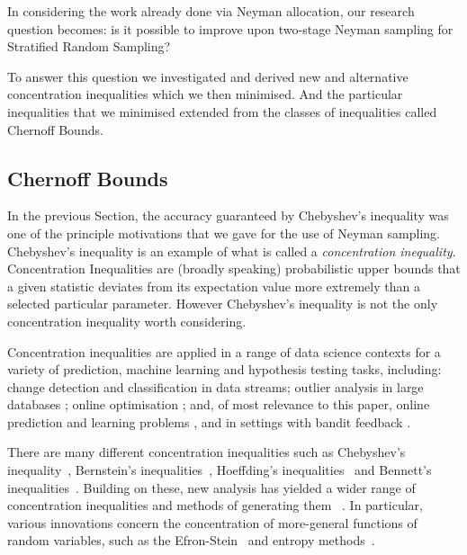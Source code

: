 In considering the work already done via Neyman allocation, our research question becomes:
is it possible to improve upon two-stage Neyman sampling for Stratified Random Sampling?

To answer this question we investigated and derived new and alternative concentration inequalities which we then minimised.  And the particular inequalities that we minimised extended from the classes of inequalities called Chernoff Bounds.

\subsection{Chernoff Bounds}

In the previous Section, the accuracy guaranteed by Chebyshev's inequality was one of the principle motivations that we gave for the use of Neyman sampling.
Chebyshev's inequality is an example of what is called a \textit{concentration inequality}.
Concentration Inequalities are (broadly speaking) probabilistic upper bounds that a given statistic deviates from its expectation value more extremely than a selected particular parameter.
However Chebyshev's inequality is not the only concentration inequality worth considering.

Concentration inequalities are applied in a range of data science contexts for a variety of prediction, machine learning and hypothesis testing tasks, including:
change detection \cite{KiferShaiGehrke2004,8000571} 
and classification \cite{Zia-UrRehman2012} in data streams;
outlier analysis in large databases \cite{Aggarwal2015};
online optimisation \cite{FlaxmanKalaiMcMahan2005,AgarwalDekelXiao2010}; and, of most relevance to this paper, 
online prediction and learning problems \cite{Cesa-BianchiLugosi2006,%
Mnih:2008:EBS:1390156.1390241,DBLP:conf/aaai/ThomasTG15,Maurer50empiricalbernstein},
and in settings with bandit feedback \cite{AuerCesa-BianchiEtal_SIAM2003,AudibertBubeck_COLT2009,Tran-ThanhChapmanRJ_AAAI2009}.

There are many different concentration inequalities such as Chebyshev's inequality~\cite{Chebyshev1}, Bernstein's inequalities~\cite{Burnstein1}, 
Hoeffding's inequalities~\cite{hoeffding1} and Bennett's inequalities~\cite{10.2307/2282438}.
Building on these, new analysis has yielded a wider range of concentration inequalities and methods of generating them ~\cite{MR3363542,Boucheron2004}. 
In particular, various innovations concern the concentration of more-general functions of random variables, such as 
the Efron-Stein~\cite{efron1981} and 
entropy methods~\cite{Boucheron_concentrationinequalities}.%

